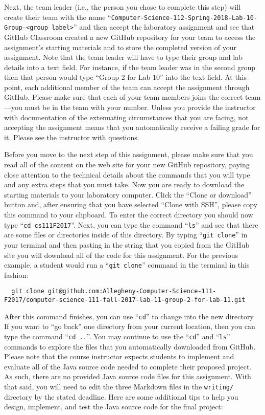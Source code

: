 \documentclass[11pt]{article}
\newcommand{\command}[1]{``\lstinline{#1}''}
\newcommand{\program}[1]{\lstinline{#1}}
\newcommand{\step}[1]{``{#1}''}
\begin{document}
Next, the team leader (i.e., the person you chose to complete this step) will
create their team with the name
\command{Computer-Science-112-Spring-2018-Lab-10-Group-<group label>} and then
accept the laboratory assignment and see that GitHub Classroom created a new
GitHub repository for your team to access the assignment's starting materials
and to store the completed version of your assignment. Note that the team leader
will have to type their group and lab details into a text field. For instance,
if the team leader was in the second group then that person would type ``Group 2
for Lab 10'' into the text field. At this point, each additional member of the
team can accept the assignment through GitHub. Please make sure that each of
your team members joins the correct team---you must be in the team with your
number. Unless you provide the instructor with documentation of the extenuating
circumstances that you are facing, not accepting the assignment means that you
automatically receive a failing grade for it. Please see the instructor with
questions.

Before you move to the next step of this assignment, please make sure that you read all of the content on the web site
for your new GitHub repository, paying close attention to the technical details about the commands that you will type
and any extra steps that you must take. Now you are ready to download the starting materials to your laboratory
computer. Click the ``Clone or download'' button and, after ensuring that you have selected ``Clone with SSH'', please
copy this command to your clipboard. To enter the correct directory you should now type \command{cd cs111F2017}. Next,
you can type the command \command{ls} and see that there are some files or directories inside of this directory. By
typing \command{git clone} in your terminal and then pasting in the string that you copied from the GitHub site you will
download all of the code for this assignment. For the previous example, a student would run a \command{git clone}
command in the terminal in this fashion:

\begin{lstlisting}
  git clone git@github.com:Allegheny-Computer-Science-111-F2017/computer-science-111-fall-2017-lab-11-group-2-for-lab-11.git
\end{lstlisting}

After this command finishes, you can use \command{cd} to change into the new directory. If you want to \step{go back}
one directory from your current location, then you can type the command \command{cd ..}. You may continue to use the
\command{cd} and \command{ls} commands to explore the files that you automatically downloaded from GitHub. Please note
that the course instructor expects students to implement and evaluate all of the Java source code needed to complete
their proposed project. As such, there are no provided Java source code files for this assignment. With that said, you
will need to edit the three Markdown files in the \program{writing/} directory by the stated deadline. Here are some
additional tips to help you design, implement, and test the Java source code for the final project:
\end{document}
